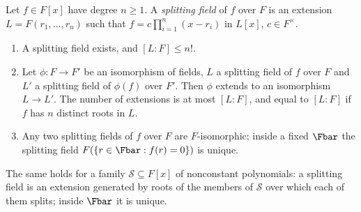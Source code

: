 \begin{theorem}\label{thm:galois:splitting-field}
Let $f\in F[x]$ have degree $n\ge1$. A \emph{splitting field} of $f$ over $F$ is an extension $L=F(r_1,\dots,r_n)$ such that $f=c\prod_{i=1}^n(x-r_i)$ in
$L[x]$, $c\in F^\times$.
\begin{enumerate}[label=(\alph*)]
\item A splitting field exists, and $[L:F]\le n!$.
\item Let $\phi\colon F\to F'$ be an isomorphism of fields, $L$ a splitting field of $f$ over $F$ and $L'$ a splitting field of $\phi(f)$ over $F'$. Then
$\phi$ extends to an isomorphism $L\to L'$. The number of extensions is at most $[L:F]$, and equal to $[L:F]$ if $f$ has $n$ distinct roots in $L$.
\item Any two splitting fields of $f$ over $F$ are $F$-isomorphic; inside a fixed $\Fbar$ the splitting field $F(\{r\in\Fbar:f(r)=0\})$ is unique.
\end{enumerate}
The same holds for a family $\mathcal{S}\subseteq F[x]$ of nonconstant polynomials: a splitting field is an extension generated by roots of the members of
$\mathcal{S}$ over which each of them splits; inside $\Fbar$ it is unique.
\end{theorem}

